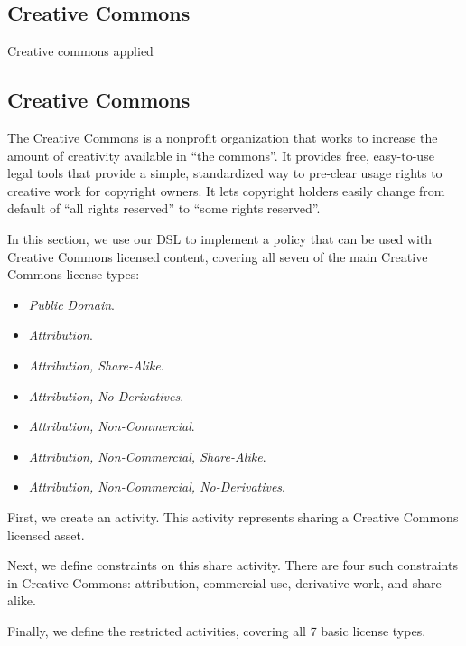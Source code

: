 \subsection{Creative Commons}\label{sec:model-cc}
Creative commons applied\subsection{Creative Commons}\label{sec:model-cc}

The Creative Commons is a nonprofit organization that works to
increase the amount of creativity available in ``the commons''.  It provides
free, easy-to-use legal tools that provide a simple, standardized way to
pre-clear usage rights to creative work for copyright owners.  It lets
copyright holders easily change from default of ``all rights reserved'' to
``some rights reserved''.

In this section, we use our DSL to implement a policy that can be used with
Creative Commons licensed content, covering all seven of the main Creative
Commons license types: 

\begin{itemize}
\item \textit{Public Domain}.
\item \textit{Attribution}.
\item \textit{Attribution, Share-Alike}.
\item \textit{Attribution, No-Derivatives}.
\item \textit{Attribution, Non-Commercial}.
\item \textit{Attribution, Non-Commercial, Share-Alike}.
\item \textit{Attribution, Non-Commercial, No-Derivatives}.
\end{itemize}


First, we create an activity.  This activity represents sharing a Creative
Commons licensed asset.



Next, we define constraints on this share activity.  There are four such
constraints in Creative Commons: attribution, commercial use, derivative work,
and share-alike.



Finally, we define the restricted activities, covering all 7 basic license
types.

